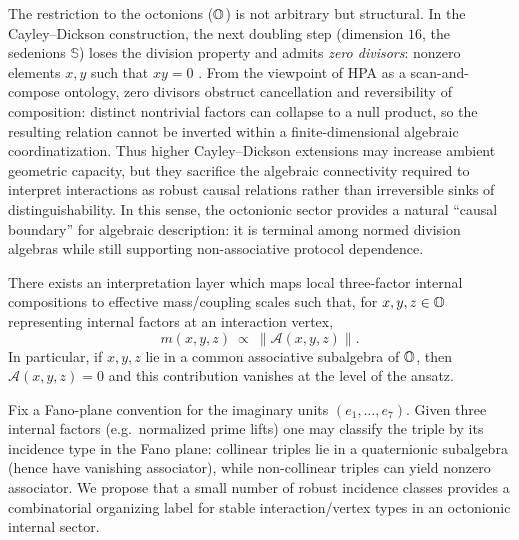 \begin{remark}
The restriction to the octonions ($\mathbb{O}$) is not arbitrary but structural.
In the Cayley--Dickson construction, the next doubling step (dimension $16$, the sedenions $\mathbb{S}$) loses the division property and admits \emph{zero divisors}: nonzero elements $x,y$ such that $xy=0$ \cite{Baez2002,ConwaySmith2003}.
From the viewpoint of HPA as a scan-and-compose ontology, zero divisors obstruct cancellation and reversibility of composition: distinct nontrivial factors can collapse to a null product, so the resulting relation cannot be inverted within a finite-dimensional algebraic coordinatization.
Thus higher Cayley--Dickson extensions may increase ambient geometric capacity, but they sacrifice the algebraic connectivity required to interpret interactions as robust causal relations rather than irreversible sinks of distinguishability.
In this sense, the octonionic sector provides a natural ``causal boundary'' for algebraic description: it is terminal among normed division algebras while still supporting non-associative protocol dependence.
\end{remark}

\begin{assumption}
\label{assump:mass_associator}
There exists an interpretation layer which maps local three-factor internal compositions to effective mass/coupling scales such that, for $x,y,z\in\mathbb{O}$ representing internal factors at an interaction vertex,
$$
m(x,y,z)\ \propto\ \|\mathcal{A}(x,y,z)\|.
$$
In particular, if $x,y,z$ lie in a common associative subalgebra of $\mathbb{O}$, then $\mathcal{A}(x,y,z)=0$ and this contribution vanishes at the level of the ansatz.
\end{assumption}

\begin{assumption}
\label{assump:generations_fano}
Fix a Fano-plane convention for the imaginary units $(e_1,\dots,e_7)$.
Given three internal factors (e.g.\ normalized prime lifts) one may classify the triple by its incidence type in the Fano plane: collinear triples lie in a quaternionic subalgebra (hence have vanishing associator), while non-collinear triples can yield nonzero associator.
We propose that a small number of robust incidence classes provides a combinatorial organizing label for stable interaction/vertex types in an octonionic internal sector.
\end{assumption}

